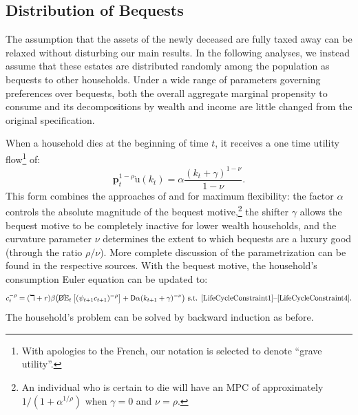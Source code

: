 \documentclass[11pt,a4paper,pdftex]{article}\usepackage[pdftex]{graphicx}\usepackage{epstopdf} \usepackage[pdftex]{hyperref}
\newcommand{\cRat}{\ensuremath{c}}
\newcommand{\CRRA}{\ensuremath{\rho}}
\newcommand{\Discount}{\ensuremath{\beta}}
\newcommand{\Ex}{\ensuremath{\mathbb{E}}} %
\newcommand{\kRat}{\ensuremath{k}}
\newcommand{\PDies}{\ensuremath{\mathsf{D}}}
\newcommand{\pLev}{\ensuremath{\pmb{p}}}
\newcommand{\PLives}{\ensuremath{\cancel{\PDies}}}
\newcommand{\pshk}{\psi} %
\newcommand{\rProd}{\ensuremath{\mathit{r}}}
\newcommand{\util}{{\ensuremath{\mathrm{u}}}}
\begin{document}
\subsection{Distribution of Bequests}

The assumption that the assets of the newly deceased are fully taxed away can be relaxed without disturbing our main results.  In the following analyses, we instead assume that these estates are distributed randomly among the population as bequests to other households.  Under a wide range of parameters governing preferences over bequests, both the overall aggregate marginal propensity to consume and its decompositions by wealth and income are little changed from the original specification.

When a household dies at the beginning of time $t$, it receives a one time utility flow\footnote{With apologies to the French, our notation is selected to denote ``grave utility''.} of:
\begin{equation*}
\pLev_t ^{1-\CRRA}\grave{\util}(\kRat_t) = \alpha \frac{(\kRat_t + \gamma)^{1-\nu}}{1 - \nu}.
\end{equation*}
This form combines the approaches of \cite{Cagetti} and \cite{WhyDoRichSave} for maximum flexibility: the factor $\alpha$ controls the absolute magnitude of the bequest motive,\footnote{An individual who is certain to die will have an MPC of approximately $1/(1 + \alpha^{1/\CRRA})$ when $\gamma = 0$ and $\nu = \CRRA$.} the shifter $\gamma$ allows the bequest motive to be completely inactive for lower wealth households, and the curvature parameter $\nu$ determines the extent to which bequests are a luxury good (through the ratio $\CRRA/\nu$).  More complete discussion of the parametrization can be found in the respective sources.  With the bequest motive, the household's consumption Euler equation can be updated to:
\begin{equation*}
\cRat_t^{-\CRRA} = (\daleth +\rProd) \Discount \big( \PLives \Ex_t \left[ (\pshk_{t+1} \cRat_{t+1})^{-\CRRA} \right] + \PDies \alpha(\kRat_{t+1} + \gamma)^{-\nu}\big) \text{ s.t. \eqref{LifeCycleConstraint1}--\eqref{LifeCycleConstraint4}}.
\end{equation*}
The household's problem can be solved by backward induction as before.
\end{document}
